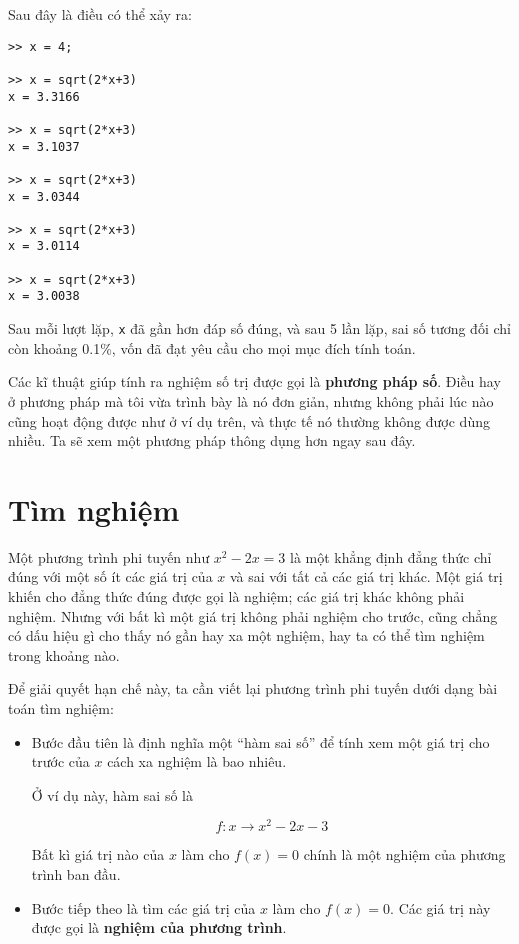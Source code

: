 \documentclass[12pt]{book}
\begin{document}
Sau đây là điều có thể xảy ra:

\begin{verbatim}
>> x = 4;

>> x = sqrt(2*x+3)
x = 3.3166

>> x = sqrt(2*x+3)
x = 3.1037

>> x = sqrt(2*x+3)
x = 3.0344

>> x = sqrt(2*x+3)
x = 3.0114

>> x = sqrt(2*x+3)
x = 3.0038
\end{verbatim}
%
Sau mỗi lượt lặp, {\tt x} đã gần hơn đáp số đúng,
và sau 5 lần lặp, sai số tương đối chỉ còn khoảng 0.1\%, vốn
đã đạt yêu cầu cho mọi mục đích tính toán.

Các kĩ thuật giúp tính ra nghiệm số trị được gọi là 
{\bf phương pháp số}. Điều hay ở phương pháp mà tôi vừa
trình bày là nó đơn giản, nhưng không phải lúc nào cũng
hoạt động được như ở ví dụ trên, và thực tế nó thường
không được dùng nhiều. Ta sẽ xem một phương pháp 
thông dụng hơn ngay sau đây.


\section{Tìm nghiệm}
\label{zero}

Một phương trình phi tuyến như $x^2 - 2x = 3$ là một 
khẳng định đẳng thức chỉ đúng với một số ít các giá trị của $x$
và sai với tất cả các giá trị khác. Một giá trị khiến cho đẳng thức
đúng được gọi là nghiệm; các giá trị khác không phải nghiệm.
Nhưng với bất kì một giá trị không phải nghiệm cho trước, cũng
chẳng có dấu hiệu gì cho thấy nó gần hay xa một nghiệm, hay
ta có thể tìm nghiệm trong khoảng nào.

Để giải quyết hạn chế này, ta cần viết lại phương trình
phi tuyến dưới dạng bài toán tìm nghiệm:

\begin{itemize}

\item Bước đầu tiên là định nghĩa một
``hàm sai số'' để tính xem một giá trị cho trước
của $x$ cách xa nghiệm là bao nhiêu.

Ở ví dụ này, hàm sai số là

\[ f : x \to x^2 - 2x -3 \]

Bất kì giá trị nào của $x$ làm cho $f(x) = 0$ chính là một
nghiệm của phương trình ban đầu.

\item Bước tiếp theo là tìm các giá trị của $x$ làm cho
$f(x) = 0$. Các giá trị này được gọi là {\bf nghiệm của phương trình}.

\end{itemize}
\end{document}
